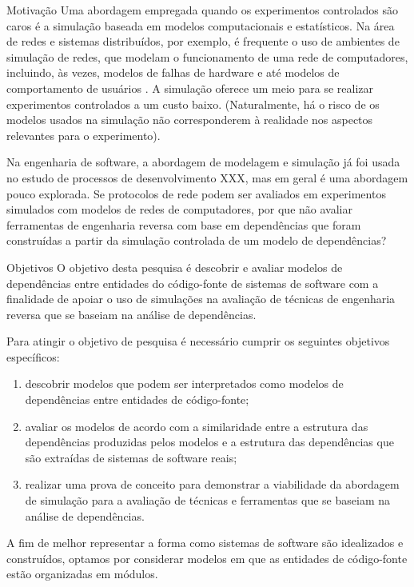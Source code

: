 \begin{section}{Motivação}
		Uma abordagem empregada quando os experimentos controlados são caros é a simulação baseada em modelos computacionais e estatísticos. Na área de redes e sistemas distribuídos, por exemplo, é frequente o uso de ambientes de simulação de redes, que modelam o funcionamento de uma rede de computadores, incluindo, às vezes, modelos de falhas de hardware e até modelos de comportamento de usuários \cite{White2002}. A simulação oferece um meio para se realizar experimentos controlados a um custo baixo. (Naturalmente, há o risco de os modelos usados na simulação não corresponderem à realidade nos aspectos relevantes para o experimento).

		Na engenharia de software, a abordagem de modelagem e simulação já foi usada no estudo de processos de desenvolvimento XXX, mas em geral é uma abordagem pouco explorada. Se protocolos de rede podem ser avaliados em experimentos simulados com modelos de redes de computadores, por que não avaliar ferramentas de engenharia reversa com base em dependências que foram construídas a partir da simulação controlada de um modelo de dependências?
		
\end{section}

\begin{section}{Objetivos}
	O objetivo desta pesquisa é descobrir e avaliar modelos de dependências entre entidades do código-fonte de sistemas de software com a finalidade de apoiar o uso de simulações na avaliação de técnicas de engenharia reversa que se baseiam na análise de dependências.
	
	Para atingir o objetivo de pesquisa é necessário cumprir os seguintes objetivos específicos:
	
	\begin{enumerate}
		\item descobrir modelos que podem ser interpretados como modelos de dependências entre entidades de código-fonte;
		\item avaliar os modelos de acordo com a similaridade entre a estrutura das dependências produzidas pelos modelos e a estrutura das dependências que são extraídas de sistemas de software reais;
		\item realizar uma prova de conceito para demonstrar a viabilidade da abordagem de simulação para a avaliação de técnicas e ferramentas que se baseiam na análise de dependências.
	\end{enumerate}
	
	A fim de melhor representar a forma como sistemas de software são idealizados e construídos, optamos por considerar modelos em que as entidades de código-fonte estão organizadas em módulos. %
	
\end{section}

